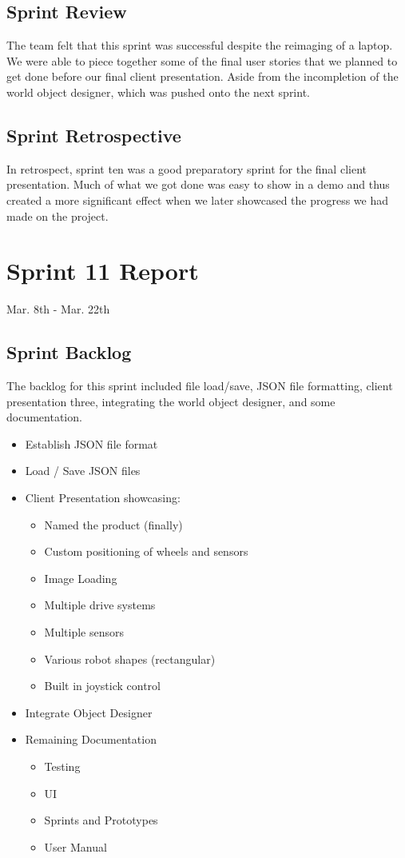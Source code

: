 \subsection{Sprint Review}
The team felt that this sprint was successful despite the reimaging of a laptop. We were able to piece together some of the final user stories that we planned to get done before our final client presentation. Aside from the incompletion of the world object designer, which was pushed onto the next sprint.

\subsection{Sprint Retrospective}

In retrospect, sprint ten was a good preparatory sprint for the final client presentation. Much of what we got done was easy to show in a demo and thus created a more significant effect when we later showcased the progress we had made on the project.


\section{Sprint 11 Report}
Mar. 8th - Mar. 22th
\subsection{Sprint Backlog}

The backlog for this sprint included file load/save, JSON file formatting, client presentation three, integrating the world object designer, and some documentation.

\begin{itemize}
	\item Establish JSON file format
	\item Load / Save JSON files	
	\item Client Presentation showcasing:
	\begin{itemize}
		\item Named the product (finally) 
		\item Custom positioning of wheels and sensors
		\item Image Loading	
		\item Multiple drive systems
		\item Multiple sensors
		\item Various robot shapes (rectangular)
		\item Built in joystick control
	\end{itemize}
	\item Integrate Object Designer
	\item Remaining Documentation	
	\begin{itemize}
		\item Testing
		\item UI
		\item Sprints and Prototypes
		\item User Manual
	\end{itemize}
\end{itemize}

